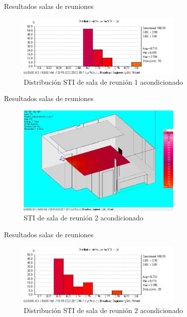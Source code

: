 \documentclass{sintefbeamer}
\begin{document}
\begin{frame}{Resultados salas de reuniones}
    \begin{figure}
        \centering
        \includegraphics[width=8cm]{images/STI acondicionado/STIdist_Reunion1_ConAcond.jpg}
        \caption{Distribución STI de sala de reunión 1 acondicionado}
        \label{fig:dis STI sala 1 acond}
    \end{figure}
\end{frame}

\begin{frame}{Resultados salas de reuniones}
    \begin{figure}
        \centering
        \includegraphics[width=8cm]{images/STI acondicionado/STI_Reunion2_ConAcond.jpg}
        \caption{STI de sala de reunión 2 acondicionado}
        \label{fig:STI sala 2 acond}
    \end{figure}
\end{frame}

\begin{frame}{Resultados salas de reuniones}
    \begin{figure}
        \centering
        \includegraphics[width=8cm]{images/STI acondicionado/STIdist_Reunion2_ConAcond.jpg}
        \caption{Distribución STI de sala de reunión 2 acondicionado}
        \label{fig:dist STI sala 2 acond}
    \end{figure}
\end{frame}
\end{document}
